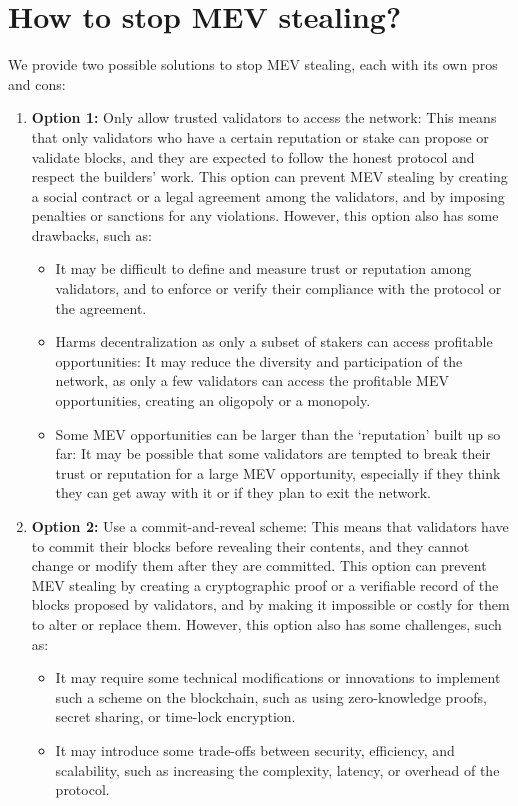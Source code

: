 \section{How to stop MEV stealing?}
We provide two possible solutions to stop MEV stealing, each with its own pros and cons:
\begin{enumerate}
	\item \textbf{Option 1:} Only allow trusted validators to access the network: This means that only validators who have a certain reputation or stake can propose or validate blocks, and they are expected to follow the honest protocol and respect the builders’ work. This option can prevent MEV stealing by creating a social contract or a legal agreement among the validators, and by imposing penalties or sanctions for any violations. However, this option also has some drawbacks, such as:
	\begin{itemize}
		\item It may be difficult to define and measure trust or reputation among validators, and to enforce or verify their compliance with the protocol or the agreement.
		\item Harms decentralization as only a subset of stakers can access profitable opportunities: It may reduce the diversity and participation of the network, as only a few validators can access the profitable MEV opportunities, creating an oligopoly or a monopoly.
		\item Some MEV opportunities can be larger than the ‘reputation’ built up so far: It may be possible that some validators are tempted to break their trust or reputation for a large MEV opportunity, especially if they think they can get away with it or if they plan to exit the network.
	\end{itemize}
	\item \textbf{Option 2:} Use a commit-and-reveal scheme: This means that validators have to commit their blocks before revealing their contents, and they cannot change or modify them after they are committed. This option can prevent MEV stealing by creating a cryptographic proof or a verifiable record of the blocks proposed by validators, and by making it impossible or costly for them to alter or replace them. However, this option also has some challenges, such as:
	\begin{itemize}
		\item It may require some technical modifications or innovations to implement such a scheme on the blockchain, such as using zero-knowledge proofs, secret sharing, or time-lock encryption.
		\item It may introduce some trade-offs between security, efficiency, and scalability, such as increasing the complexity, latency, or overhead of the protocol.
	\end{itemize}
\end{enumerate}

